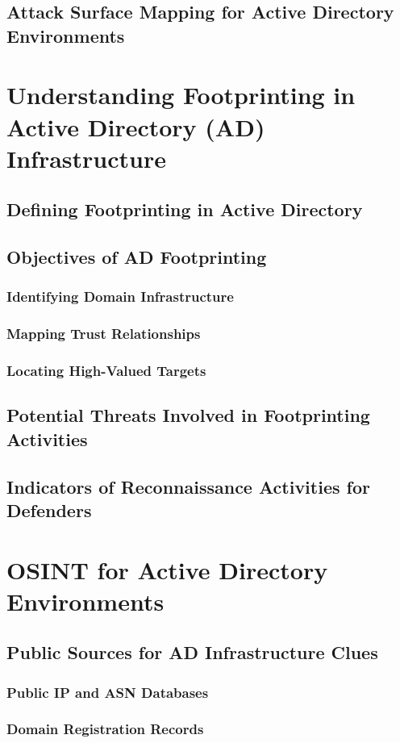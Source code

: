 \documentclass{article}
\begin{document}
\subsection{Attack Surface Mapping for Active Directory Environments}
\section{Understanding Footprinting in Active Directory (AD) Infrastructure}
\subsection{Defining Footprinting in Active Directory}
\subsection{Objectives of AD Footprinting}
\subsubsection{Identifying Domain Infrastructure}
\subsubsection{Mapping Trust Relationships}
\subsubsection{Locating High-Valued Targets}
\subsection{Potential Threats Involved in Footprinting Activities}
\subsection{Indicators of Reconnaissance Activities for Defenders}
\section{OSINT for Active Directory Environments}
\subsection{Public Sources for AD Infrastructure Clues}
\subsubsection{Public IP and ASN Databases}
\subsubsection{Domain Registration Records}
\end{document}
